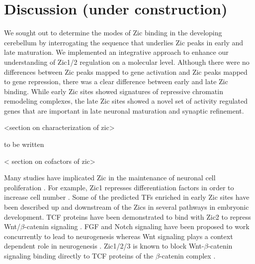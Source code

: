 \documentclass[fleqn,10pt]{wlscirep}
\begin{document}
\section*{Discussion (under construction)}
We sought out to determine the modes of Zic binding in the developing cerebellum by interrogating the sequence that underlies Zic peaks in early and late maturation. We implemented an integrative approach to enhance our understanding of Zic1/2 regulation on a molecular level. Although there were no differences between Zic peaks mapped to gene activation and Zic peaks mapped to gene repression, there was a clear difference between early and late Zic binding. While early Zic sites showed signatures of repressive chromatin remodeling complexes, the late Zic sites showed a novel set of activity regulated genes that are important in late neuronal maturation and synaptic refinement. 

<section on characterization of zic>

to be written

< section on cofactors of zic>




Many studies have implicated Zic in the maintenance of neuronal cell proliferation \cite{Lim2007Zic3Cells,Janesick2013ERFNeurogenesis, Aruga2002Zic1Differentiation, Ebert2003Zic1Autoregulation }. For example, Zic1 represses differentiation factors in order to increase cell number \cite{Aruga2002Zic1Differentiation}. Some of the predicted TFs enriched in early Zic sites have been described up and downstream of the Zics in several pathways in embryonic development. TCF proteins have been demonstrated to bind with Zic2 to repress  Wnt/$\beta$-catenin signaling \cite{Aruga2018Zic1, Lowenstein2021Olig3Development}. FGF and Notch signaling have been proposed to work concurrently to lead to neurogenesis \cite{Voelkel2014FGFHierarchy} whereas Wnt signaling plays a context dependent role in neurogenesis \cite{Lassiter2014SignalingDelamination}. Zic1/2/3 is known to block Wnt-$\beta$-catenin signaling binding directly to TCF proteins of the $\beta$-catenin complex \cite{Ge2020Zic1Transition, Fujimi2012XenopusPathway, Murgan2015AtypicalPrecursors, Pourebrahim2011TranscriptionSignaling, Aruga2018ZicDisease,Aruga2018Zic1,Lowenstein2021Olig3Development}.  
\end{document}
